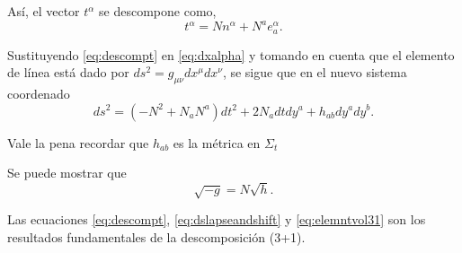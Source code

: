 \begin{center}
\end{center}

As\'{i}, el vector $t^{\alpha}$ se descompone como,
%
\begin{equation}
\label{eq:descompt}
t^{\alpha} = N n^{\alpha} + N^{a} e^{\alpha}_{a}.
\end{equation}

Sustituyendo \eqref{eq:descompt} en \eqref{eq:dxalpha} y tomando en cuenta que el elemento de l\'{i}nea est\'{a} dado por $ds^{2} = g_{\mu \nu} d x^{\mu} d x^{\nu}$, se sigue que en el nuevo sistema coordenado
%
\begin{equation}
\label{eq:dslapseandshift}
ds^{2} = (-N^{2} + N_{a} N^{a}) dt^{2} + 2 N_{a} dt dy^{a} + h_{ab} dy^{a} dy^{b}.
\end{equation}

%
%

Vale la pena recordar que $h_{ab}$ es la m\'{e}trica en $\Sigma_{t}$

Se puede mostrar que
%
\begin{equation}
\label{eq:elemntvol31}
\sqrt{-g} = N \sqrt{h}.
\end{equation}

Las ecuaciones \eqref{eq:descompt}, \eqref{eq:dslapseandshift} y \eqref{eq:elemntvol31} son los resultados fundamentales de la descomposici\'{o}n (3+1).